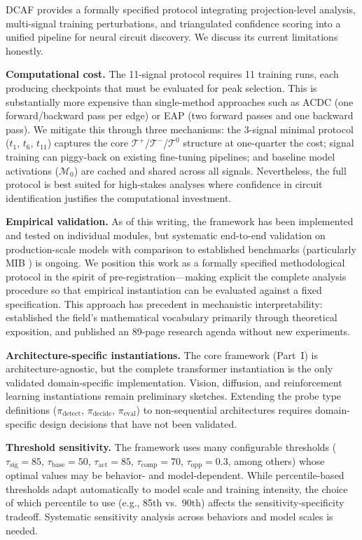 \documentclass[11pt]{article}
\begin{document}
DCAF provides a formally specified protocol integrating projection-level analysis, multi-signal training perturbations, and triangulated confidence scoring into a unified pipeline for neural circuit discovery. We discuss its current limitations honestly.

\textbf{Computational cost.} The 11-signal protocol requires 11 training runs, each producing checkpoints that must be evaluated for peak selection. This is substantially more expensive than single-method approaches such as ACDC (one forward/backward pass per edge) or EAP (two forward passes and one backward pass). We mitigate this through three mechanisms: the 3-signal minimal protocol ($t_1$, $t_6$, $t_{11}$) captures the core $\mathcal{T}^+$/$\mathcal{T}^-$/$\mathcal{T}^0$ structure at one-quarter the cost; signal training can piggy-back on existing fine-tuning pipelines; and baseline model activations ($\mathcal{M}_0$) are cached and shared across all signals. Nevertheless, the full protocol is best suited for high-stakes analyses where confidence in circuit identification justifies the computational investment.

\textbf{Empirical validation.} As of this writing, the framework has been implemented and tested on individual modules, but systematic end-to-end validation on production-scale models with comparison to established benchmarks (particularly MIB \citep{mueller2025mib}) is ongoing. We position this work as a formally specified methodological protocol in the spirit of pre-registration---making explicit the complete analysis procedure so that empirical instantiation can be evaluated against a fixed specification. This approach has precedent in mechanistic interpretability: \citet{elhage2021mathematical} established the field's mathematical vocabulary primarily through theoretical exposition, and \citet{sharkey2025openproblems} published an 89-page research agenda without new experiments.

\textbf{Architecture-specific instantiations.} The core framework (Part~I) is architecture-agnostic, but the complete transformer instantiation is the only validated domain-specific implementation. Vision, diffusion, and reinforcement learning instantiations remain preliminary sketches. Extending the probe type definitions ($\pi_{\text{detect}}$, $\pi_{\text{decide}}$, $\pi_{\text{eval}}$) to non-sequential architectures requires domain-specific design decisions that have not been validated.

\textbf{Threshold sensitivity.} The framework uses many configurable thresholds ($\tau_{\text{sig}}=85$, $\tau_{\text{base}}=50$, $\tau_{\text{act}}=85$, $\tau_{\text{comp}}=70$, $\tau_{\text{opp}}=0.3$, among others) whose optimal values may be behavior- and model-dependent. While percentile-based thresholds adapt automatically to model scale and training intensity, the choice of which percentile to use (e.g., 85th vs.\ 90th) affects the sensitivity-specificity tradeoff. Systematic sensitivity analysis across behaviors and model scales is needed.
\end{document}
